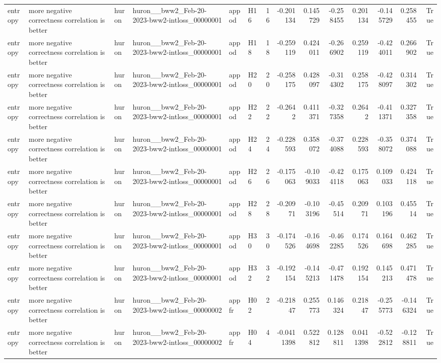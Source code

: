 \begin{longtable}{llllllrrrrrrrr}
entropy & more negative correctness correlation is better & huron & huron\_\_bww2\_Feb-20-2023-bww2-intloss\_00000001 & appod & H16 & 16 & -0.201134 & 0.145729 & -0.258455 & 0.201134 & -0.145729 & 0.258455 & True \\
entropy & more negative correctness correlation is better & huron & huron\_\_bww2\_Feb-20-2023-bww2-intloss\_00000001 & appod & H18 & 18 & -0.259119 & 0.424011 & -0.266902 & 0.259119 & -0.424011 & 0.266902 & True \\
entropy & more negative correctness correlation is better & huron & huron\_\_bww2\_Feb-20-2023-bww2-intloss\_00000001 & appod & H20 & 20 & -0.258175 & 0.428097 & -0.314302 & 0.258175 & -0.428097 & 0.314302 & True \\
entropy & more negative correctness correlation is better & huron & huron\_\_bww2\_Feb-20-2023-bww2-intloss\_00000001 & appod & H22 & 22 & -0.2642 & 0.411371 & -0.327358 & 0.2642 & -0.411371 & 0.327358 & True \\
entropy & more negative correctness correlation is better & huron & huron\_\_bww2\_Feb-20-2023-bww2-intloss\_00000001 & appod & H24 & 24 & -0.228593 & 0.358072 & -0.374088 & 0.228593 & -0.358072 & 0.374088 & True \\
entropy & more negative correctness correlation is better & huron & huron\_\_bww2\_Feb-20-2023-bww2-intloss\_00000001 & appod & H26 & 26 & -0.175063 & -0.109033 & -0.424118 & 0.175063 & 0.109033 & 0.424118 & True \\
entropy & more negative correctness correlation is better & huron & huron\_\_bww2\_Feb-20-2023-bww2-intloss\_00000001 & appod & H28 & 28 & -0.20971 & -0.103196 & -0.45514 & 0.20971 & 0.103196 & 0.45514 & True \\
entropy & more negative correctness correlation is better & huron & huron\_\_bww2\_Feb-20-2023-bww2-intloss\_00000001 & appod & H30 & 30 & -0.174526 & -0.164698 & -0.462285 & 0.174526 & 0.164698 & 0.462285 & True \\
entropy & more negative correctness correlation is better & huron & huron\_\_bww2\_Feb-20-2023-bww2-intloss\_00000001 & appod & H32 & 32 & -0.192154 & -0.145213 & -0.471478 & 0.192154 & 0.145213 & 0.471478 & True \\
entropy & more negative correctness correlation is better & huron & huron\_\_bww2\_Feb-20-2023-bww2-intloss\_00000002 & appfr & H02 & 2 & -0.21847 & 0.255773 & 0.146324 & 0.21847 & -0.255773 & -0.146324 & True \\
entropy & more negative correctness correlation is better & huron & huron\_\_bww2\_Feb-20-2023-bww2-intloss\_00000002 & appfr & H04 & 4 & -0.0411398 & 0.522812 & 0.128811 & 0.0411398 & -0.522812 & -0.128811 & True \\

\end{longtable}
